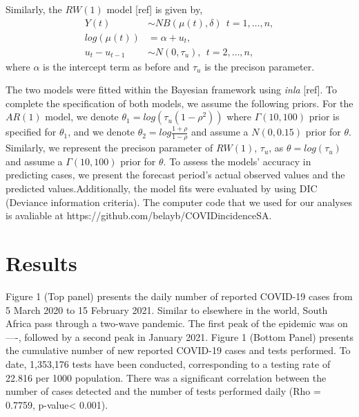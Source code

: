 \documentclass[10pt,letterpaper]{article}
\begin{document}
Similarly, the \(RW(1)\) model {[}ref{]} is given by, \[
\begin{aligned}
 Y(t) &\sim NB(\mu(t), \delta) \ \ t=1, \dots, n,\\
 log(\mu(t)) &= \alpha+u_t, \\
 u_t-u_{t-1} &\sim N(0, \tau_u), \ \ t=2, \dots, n,
\end{aligned}
\] where \(\alpha\) is the intercept term as before and \(\tau_u\) is
the precison parameter.

The two models were fitted within the Bayesian framework using
\emph{inla} {[}ref{]}. To complete the specification of both models, we
assume the following priors. For the \(AR(1)\) model, we denote
\(\theta_1=log(\tau_u(1-\rho^2))\) where \(\Gamma(10,100)\) prior is
specified for \(\theta_1\), and we denote
\(\theta_2=log\frac{1+\rho}{1-\rho}\) and assume a \(N(0, 0.15)\) prior
for \(\theta\). Similarly, we represent the precison parameter of
\(RW(1)\), \(\tau_u\), as \(\theta=log(\tau_u)\) and assume a
\(\Gamma (10,100)\) prior for \(\theta\). To assess the models' accuracy
in predicting cases, we present the forecast period's actual observed
values and the predicted values.Additionally, the model fits were
evaluated by using DIC (Deviance information criteria). The computer
code that we used for our analyses is avaliable at
https://github.com/belayb/COVIDincidenceSA.

\hypertarget{results}{%
\section{Results}\label{results}}

Figure 1 (Top panel) presents the daily number of reported COVID-19
cases from 5 March 2020 to 15 February 2021. Similar to elsewhere in the
world, South Africa pass through a two-wave pandemic. The first peak of
the epidemic was on ----, followed by a second peak in January 2021.
Figure 1 (Bottom Panel) presents the cumulative number of new reported
COVID-19 cases and tests performed. To date, 1,353,176 tests have been
conducted, corresponding to a testing rate of 22.816 per 1000
population. There was a significant correlation between the number of
cases detected and the number of tests performed daily (Rho = 0.7759,
p-value\textless{} 0.001).
\end{document}
